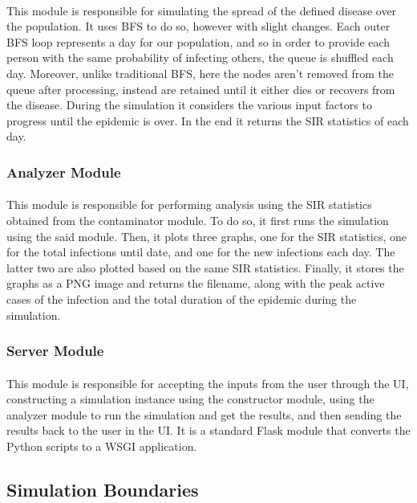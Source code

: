 \documentclass[12pt, a4paper]{extarticle}
\begin{document}
				\paragraph{} This module is responsible for simulating the spread of the defined disease over the population. It uses BFS to do so, however with slight changes. Each outer BFS loop represents a day for our population, and so in order to provide each person with the same probability of infecting others, the queue is shuffled each day. Moreover, unlike traditional BFS, here the nodes aren't removed from the queue after processing, instead are retained until it either dies or recovers from the disease. During the simulation it considers the various input factors to progress until the epidemic is over. In the end it returns the SIR statistics of each day.
			\subsubsection{Analyzer Module}
			    \paragraph{} This module is responsible for performing analysis using the SIR statistics obtained from the contaminator module. To do so, it first runs the simulation using the said module. Then, it plots three graphs, one for the SIR statistics, one for the total infections until date, and one for the new infections each day. The latter two are also plotted based on the same SIR statistics. Finally, it stores the graphs as a PNG image and returns the filename, along with the peak active cases of the infection and the total duration of the epidemic during the simulation.
			\subsubsection{Server Module}
			    \paragraph{} This module is responsible for accepting the inputs from the user through the UI, constructing a simulation instance using the constructor module, using the analyzer module to run the simulation and get the results, and then sending the results back to the user in the UI. It is a standard Flask module that converts the Python scripts to a WSGI application.
        \subsection{Simulation Boundaries}
\end{document}
